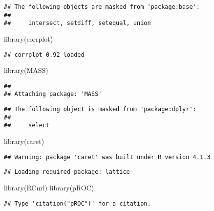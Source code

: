 \documentclass[
]{article}
\newenvironment{Shaded}{\begin{snugshade}}{\end{snugshade}}
\newcommand{\FunctionTok}[1]{\textcolor[rgb]{0.00,0.00,0.00}{#1}}
\newcommand{\NormalTok}[1]{#1}
\begin{document}
\begin{verbatim}
## The following objects are masked from 'package:base':
## 
##     intersect, setdiff, setequal, union
\end{verbatim}

\begin{Shaded}
\begin{Highlighting}[]
\FunctionTok{library}\NormalTok{(corrplot)}
\end{Highlighting}
\end{Shaded}

\begin{verbatim}
## corrplot 0.92 loaded
\end{verbatim}

\begin{Shaded}
\begin{Highlighting}[]
\FunctionTok{library}\NormalTok{(MASS)}
\end{Highlighting}
\end{Shaded}

\begin{verbatim}
## 
## Attaching package: 'MASS'
\end{verbatim}

\begin{verbatim}
## The following object is masked from 'package:dplyr':
## 
##     select
\end{verbatim}

\begin{Shaded}
\begin{Highlighting}[]
\FunctionTok{library}\NormalTok{(caret)}
\end{Highlighting}
\end{Shaded}

\begin{verbatim}
## Warning: package 'caret' was built under R version 4.1.3
\end{verbatim}

\begin{verbatim}
## Loading required package: lattice
\end{verbatim}

\begin{Shaded}
\begin{Highlighting}[]
\FunctionTok{library}\NormalTok{(RCurl)}
\FunctionTok{library}\NormalTok{(pROC)}
\end{Highlighting}
\end{Shaded}

\begin{verbatim}
## Type 'citation("pROC")' for a citation.
\end{verbatim}
\end{document}
